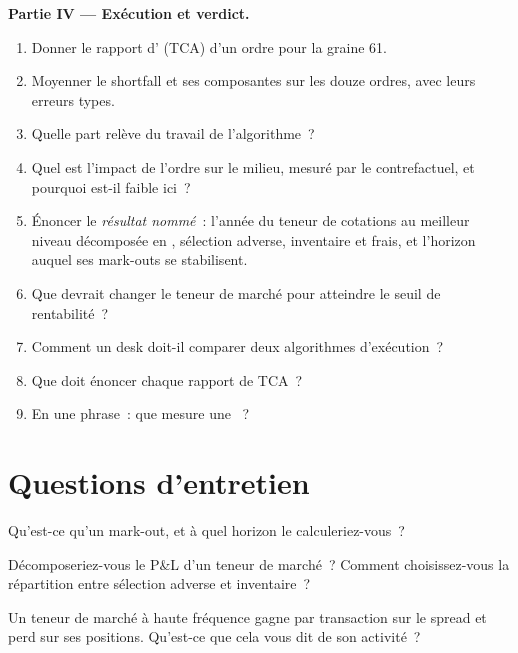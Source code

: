 \begin{problem}
\medskip\noindent\textbf{Partie IV --- Exécution et verdict.}
\begin{enumerate}[resume]
\item Donner le rapport d' (TCA) d'un ordre pour la graine 61.
\item Moyenner le shortfall et ses composantes sur les douze ordres, avec leurs erreurs types.
\item Quelle part relève du travail de l'algorithme~?
\item Quel est l'impact de l'ordre sur le milieu, mesuré par le contrefactuel, et pourquoi est-il faible ici~?
\item Énoncer le \emph{résultat nommé}~: l'année du teneur de cotations au meilleur niveau décomposée en , sélection adverse, inventaire et frais, et l'horizon auquel ses
mark-outs se stabilisent.
\item Que devrait changer le teneur de marché pour atteindre le seuil de rentabilité~?
\item Comment un desk doit-il comparer deux algorithmes d'exécution~?
\item Que doit énoncer chaque rapport de TCA~?
\item En une phrase~: que mesure une ~?
\end{enumerate}
\end{problem}

\section{Questions d'entretien}

\begin{interviewq}\label{iq:rs:measuring-market-making-and-execution:1}
Qu'est-ce qu'un mark-out, et à quel horizon le calculeriez-vous~?
\end{interviewq}

\begin{interviewq}\label{iq:rs:measuring-market-making-and-execution:2}
Décomposeriez-vous le P\&L d'un teneur de marché~? Comment choisissez-vous la répartition entre sélection adverse et inventaire~?
\end{interviewq}

\begin{interviewq}\label{iq:rs:measuring-market-making-and-execution:3}
Un teneur de marché à haute fréquence gagne  par transaction sur le spread et perd  sur ses positions. Qu'est-ce que cela vous dit de son activité~?
\end{interviewq}

